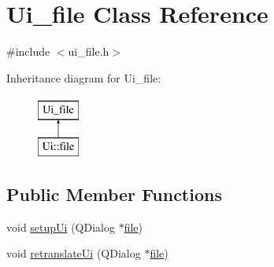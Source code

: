 \hypertarget{classUi__file}{\section{Ui\-\_\-file Class Reference}
\label{classUi__file}
}


{\ttfamily \#include $<$ui\-\_\-file.\-h$>$}

Inheritance diagram for Ui\-\_\-file\-:\begin{figure}[H]
\begin{center}
\leavevmode
\includegraphics[height=2.000000cm]{classUi__file}
\end{center}
\end{figure}
\subsection*{Public Member Functions}
\begin{DoxyCompactItemize}
\item 
void \hyperlink{classUi__file_a3b19bafe757f5f550e764e050909b5ef}{setup\-Ui} (Q\-Dialog $\ast$\hyperlink{classfile}{file})
\item 
void \hyperlink{classUi__file_a3358a361ab103a18b0ef07bde159fa33}{retranslate\-Ui} (Q\-Dialog $\ast$\hyperlink{classfile}{file})
\end{DoxyCompactItemize}
